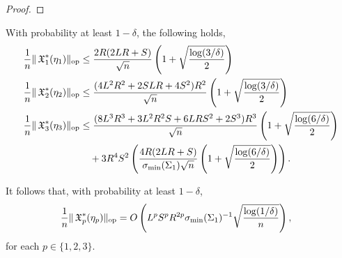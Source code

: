 \begin{proof}
\end{proof}

\begin{lemma}
\label{lem:lowRankUpper}
With probability at least $1-\delta$, the following holds,
\begin{align*}
  \frac{1}{n} \|\operatorname{\mathfrak{X}}_1^*(\eta_1)\|_{\text{\rm op}}
      &\le \frac{2R (2LR + S)}{\sqrt{n}} \left( 1 + \sqrt{\frac{\log(3/\delta)}{2}} \right) \\
  \frac{1}{n}  \|\operatorname{\mathfrak{X}}_2^*(\eta_2)\|_{\text{\rm op}} 
      &\le \frac{(4L^2 R^2 + 2 S L R + 4S^2)R^2}{\sqrt{n}} \left( 1 + \sqrt{\frac{\log(3/\delta)}{2}} \right) \\
  \frac{1}{n} \|\operatorname{\mathfrak{X}}_3^*(\eta_3)\|_{\text{\rm op}} 
      &\le \frac{(8L^3 R^3 + 3 L^2 R^2 S + 6 L R S^2 + 2S^3) R^3}{\sqrt{n}} \left( 1 + \sqrt{\frac{\log(6/\delta)}{2}} \right) \\
  &\quad + 3 R^4 S^2 \left(\frac{4R(2LR+S)}{\sigma_\text{\rm min}(\Sigma_1) \sqrt{n}} \left(1 + \sqrt{\frac{\log(6/\delta)}{2}} \right) \right).
\end{align*}
\end{lemma}

It follows that, with probability at least $1-\delta$,
\begin{align*}
  \frac{1}{n} \|\operatorname{\mathfrak{X}}_p^*(\eta_p)\|_{\text{\rm op}}
  &= O\left( L^p S^p R^{2p} \sigma_\text{\rm min}(\Sigma_1)^{-1} \sqrt{\frac{\log(1/\delta)}{n}} \right),
\end{align*}
for each $p \in \{1,2,3\}$.

